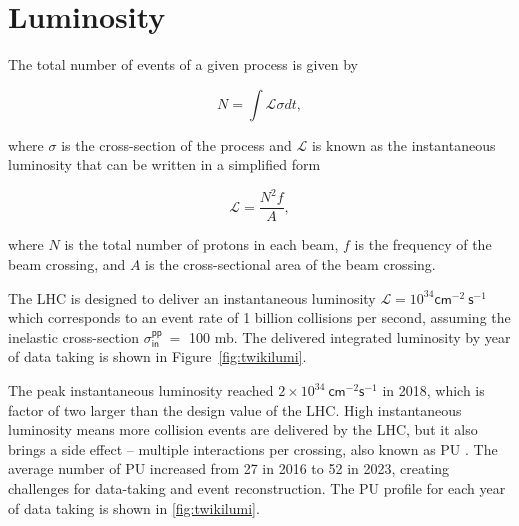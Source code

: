 \section{Luminosity}
\label{sec:Lumi}

The total number of events of a given process is given by 

\begin{equation}
N=\int\mathcal{L}\sigma dt,
\end{equation}

where $\sigma$ is the cross-section of the process and $\mathcal{L}$ is known as the instantaneous luminosity that can be written in a simplified form

\begin{equation}
\mathcal{L}=\frac{N^2f}{A},
\end{equation}

where $N$ is the total number of protons in each beam, $f$ is the frequency of the beam crossing, and $A$ is the cross-sectional area of the beam crossing.

The \ac{LHC} is designed to deliver an instantaneous luminosity $\mathcal{L}=10^{34}\textsf{cm}^{-2}~\textsf{s}^{-1}$ which corresponds to an event rate of 1 billion collisions per second, assuming the inelastic cross-section $\sigma^{\textsf{pp}}_{\textsf{in}}~=$ 100 mb. The delivered integrated luminosity by year of data taking is shown in Figure~\ref{fig:twikilumi}.

The peak instantaneous luminosity reached $2\times10^{34}~\textsf{cm}^{-2}\textsf{s}^{-1}$ in 2018, which is factor of two larger than the design value of the \ac{LHC}. High instantaneous luminosity means more collision events are delivered by the \ac{LHC}, but it also brings a side effect -- multiple interactions per crossing, also known as \ac{PU} . The average number of \ac{PU} increased from 27 in 2016 to 52 in 2023, creating challenges for data-taking and event reconstruction. The \ac{PU} profile for each year of data taking is shown in \ref{fig:twikilumi}.

